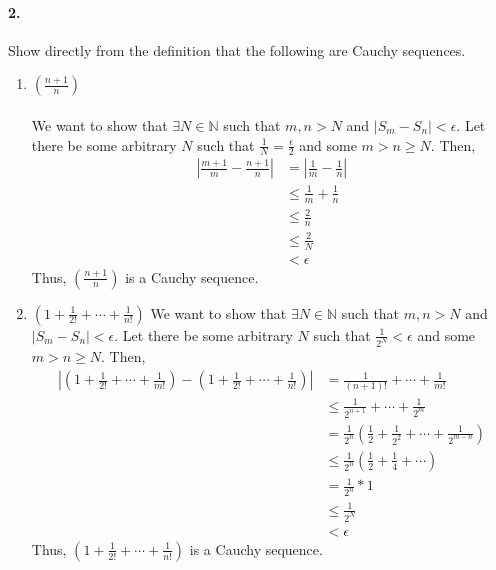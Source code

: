 \documentclass[12pt]{article}
\newcommand\N{\mathbb{N}}
\theoremstyle{remark}
\begin{document}
\paragraph{2.} Show directly from the definition that the following are Cauchy sequences.
\begin{enumerate}[label=(\alph*)]
    \item $(\frac{n + 1}{n})$ \\\null\\
    We want to show that $\exists N \in \N$ such that $m, n > N$ and $|S_m - S_n| < \epsilon$. Let there be some arbitrary $N$ such that $\frac{1}{N} = \frac{\epsilon}{2}$ and some $m > n \geq N$. Then,
    \begin{align*}
        \left\lvert\frac{m + 1}{m} - \frac{n + 1}{n}\right\rvert &= \left\lvert\frac{1}{m} - \frac{1}{n}\right\rvert \\
        &\leq \frac{1}{m} + \frac{1}{n} \\
        &\leq \frac{2}{n} \\
        &\leq \frac{2}{N} \\
        &< \epsilon
    \end{align*}
    Thus, $(\frac{n + 1}{n})$ is a Cauchy sequence.

    \item $(1 + \frac{1}{2!} + \cdots + \frac{1}{n!})$
    We want to show that $\exists N \in \N$ such that $m, n > N$ and $|S_m - S_n| < \epsilon$. Let there be some arbitrary $N$ such that $\frac{1}{2^N} < \epsilon$ and some $m > n \geq N$. Then,
    \begin{align*}
        \left\lvert\left(1 + \frac{1}{2!} + \cdots + \frac{1}{m!}\right) - \left(1 + \frac{1}{2!} + \cdots + \frac{1}{n!}\right)\right\rvert &= \frac{1}{(n + 1)!} + \cdots + \frac{1}{m!} \\
        &\leq \frac{1}{2^{n + 1}} + \cdots + \frac{1}{2^m} \\
        &= \frac{1}{2^n} \left(\frac{1}{2} + \frac{1}{2^2} + \cdots + \frac{1}{2^{m - n}}\right) \\
        &\leq \frac{1}{2^n} \left(\frac{1}{2} + \frac{1}{4} + \cdots\right) \\
        &= \frac{1}{2^n} * 1 \\
        &\leq \frac{1}{2^N} \\
        &< \epsilon
    \end{align*}
    Thus, $(1 + \frac{1}{2!} + \cdots + \frac{1}{n!})$ is a Cauchy sequence.
\end{enumerate}
\end{document}
